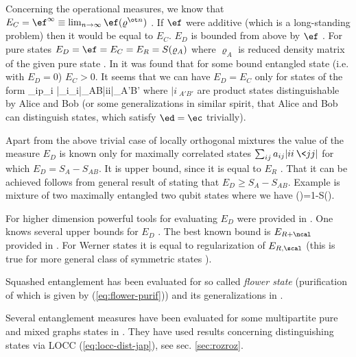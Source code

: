 \documentclass[rmp,12pt,preprint]{revtex4-2}
\begin{document}
Concerning the operational measures, we know that
$E_C=\ef^\infty\equiv \lim_{n\to\infty} \ef(\varrho^{\ot n})$
\cite{cost}. If $\ef$ were additive (which is a long-standing
problem) then it would be equal to $E_C$. $E_D$ is bounded from
above by $\ef$ \cite{BDSW1996}. For pure states
$E_D=\ef=E_C=E_R=S(\varrho_A)$ where $\varrho_A$ is reduced density
matrix of the given pure state \cite{BBPS1996,PlenioVedral1998}. In
\cite{VidalC-irre} it was found that for some bound entangled
state (i.e. with $E_D=0$) $E_C>0$. It seems that we can have
$E_D=E_C$ only for states of the form
\be
\sum_ip_i
|\psi_i\>\<\psi_i|_{AB}\ot |i\>\<i|_{A'B'}
\ee
where $|i\>_{A'B'}$
are product states distinguishable by Alice and Bob \cite{termo} (or
some generalizations in  similar spirit, that Alice and Bob can
distinguish states, which satisfy  $\ed=\ec$ trivially).

Apart from the above trivial case of locally orthogonal mixtures
the value of the measure $E_D$ is known only for
maximally correlated states $\sum_{ij} a_{ij} |ii\>\<jj|$ for which
$E_D =S_A - S_{AB}$. It is upper bound, since it is equal to $E_R$
\cite{Rains1999}. That it can be achieved follows from general
result of \cite{DevetakWinter-hash} stating that $E_D\geq
S_A-S_{AB}$. Example is  mixture of two maximally entangled two
qubit states where we have
\be
\ed(\varrho)=1-S(\varrho).
\ee




For higher dimension  powerful tools for evaluating $E_D$ were provided
in \cite{Rains2001}. One knows several upper bounds for $E_D$
\cite{BDSW1996,PlenioVedral1998,Rains1999,irrev,Vidal-Werner,Rains2001}.
The best known bound is $E_{R+\ncal}$ provided in \cite{Rains2001}. For Werner
states it is equal  to regularization of $E_{R,\scal}$
(this is true for more general class of symmetric states  \cite{AudenaertMVW2002-asym-oo}).

Squashed entanglement has been evaluated for so called {\it flower state}
(purification of which is given by (\ref{eq:flower-purif}))
and its generalizations in \cite{ChristandlW-lock}.

Several entanglement measures have been evaluated for some multipartite
pure and mixed graphs states in \cite{MarkhamMV2007-em-graph}.
They have used results concerning distinguishing states via LOCC (\ref{eq:locc-dist-jap}), see sec. \ref{sec:rozroz}.
\end{document}
